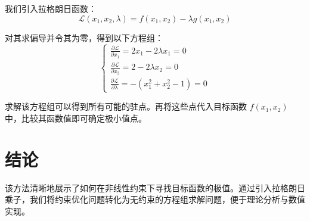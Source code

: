 我们引入拉格朗日函数：
\[
\mathcal{L}(x_1, x_2, \lambda) = f(x_1, x_2) - \lambda g(x_1, x_2)
\]

对其求偏导并令其为零，得到以下方程组：
\[
\begin{cases}
\frac{\partial \mathcal{L}}{\partial x_1} = 2x_1 - 2\lambda x_1 = 0 \\
\frac{\partial \mathcal{L}}{\partial x_2} = 2 - 2\lambda x_2 = 0 \\
\frac{\partial \mathcal{L}}{\partial \lambda} = - (x_1^2 + x_2^2 - 1) = 0
\end{cases}
\]

求解该方程组可以得到所有可能的驻点。再将这些点代入目标函数 \( f(x_1, x_2) \) 中，比较其函数值即可确定极小值点。

\section{结论}

该方法清晰地展示了如何在非线性约束下寻找目标函数的极值。通过引入拉格朗日乘子，我们将约束优化问题转化为无约束的方程组求解问题，便于理论分析与数值实现。


